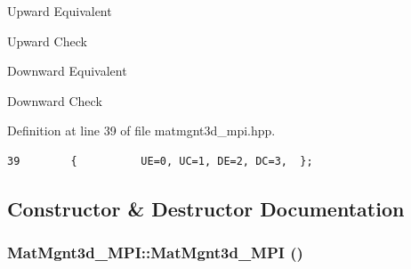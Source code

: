\begin{Desc}
\item[Enumerator: ]\par
\begin{description}
\item[{\em 
UE\label{classMatMgnt3d__MPI_dca29a1140aadadfd92b34a02fa516ef_dca29a1140aadadfd92b34a02fa516ef0612e93d65abcdaeed533a0876474251}
}]Upward Equivalent \item[{\em 
UC\label{classMatMgnt3d__MPI_dca29a1140aadadfd92b34a02fa516ef_dca29a1140aadadfd92b34a02fa516ef6a2fb30a2dacdda4d74122697262a8b7}
}]Upward Check \item[{\em 
DE\label{classMatMgnt3d__MPI_dca29a1140aadadfd92b34a02fa516ef_dca29a1140aadadfd92b34a02fa516ef3a52f3c22ed6fcde5bf696a6c02c9e73}
}]Downward Equivalent \item[{\em 
DC\label{classMatMgnt3d__MPI_dca29a1140aadadfd92b34a02fa516ef_dca29a1140aadadfd92b34a02fa516efcf75e54791dd1f49f918345fdfe2430b}
}]Downward Check \end{description}
\end{Desc}



Definition at line 39 of file matmgnt3d\_\-mpi.hpp.

\footnotesize\begin{verbatim}39        {          UE=0, UC=1, DE=2, DC=3,  };
\end{verbatim}\normalsize 




\subsection{Constructor \& Destructor Documentation}
\subsubsection{\setlength{\rightskip}{0pt plus 5cm}Mat\-Mgnt3d\_\-MPI::Mat\-Mgnt3d\_\-MPI ()}\label{classMatMgnt3d__MPI_e4f3dfb2760a6160a44ad814fbe9116c_e4f3dfb2760a6160a44ad814fbe9116c}




